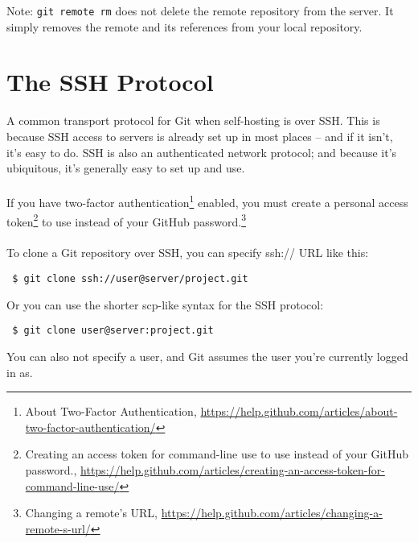 \documentclass[12pt,letterpaper,dvips]{article}
\newcommand{\cmd}[1]{\texttt{#1}}
\begin{document}
\noindent Note: \cmd{git remote rm} does not delete the remote
repository from the server.  It simply removes the remote and
its references from your local repository.


\newpage
\section{The SSH Protocol}
A common transport protocol for Git when self-hosting is over SSH.
This is because SSH access to servers is already set up in most
places – and if it isn’t, it's easy to do.  SSH is also an
authenticated network protocol; and because it’s ubiquitous,
it's generally easy to set up and use.
\\
\\
If you have two-factor authentication\footnote{About Two-Factor Authentication,
\href{https://help.github.com/articles/about-two-factor-authentication/}{https://help.github.com/articles/about-two-factor-authentication/}}
enabled, you must create a personal access token\footnote{Creating
an access token for command-line use to use instead of your GitHub password.,
\href{https://help.github.com/articles/creating-an-access-token-for-command-line-use/}{https://help.github.com/articles/creating-an-access-token-for-command-line-use/}}
 to use instead of your GitHub password.\footnote{Changing a remote's URL,
 \href{https://help.github.com/articles/changing-a-remote-s-url/}{https://help.github.com/articles/changing-a-remote-s-url/}}
\\
\\
To clone a Git repository over SSH, you can specify ssh:// URL like this:

\begin{Verbatim}
 $ git clone ssh://user@server/project.git
\end{Verbatim}

\noindent Or you can use the shorter scp-like syntax for the SSH
protocol:

\begin{Verbatim}
 $ git clone user@server:project.git
\end{Verbatim}

\noindent You can also not specify a user, and Git assumes the
user you’re currently logged in as.


\end{document}
